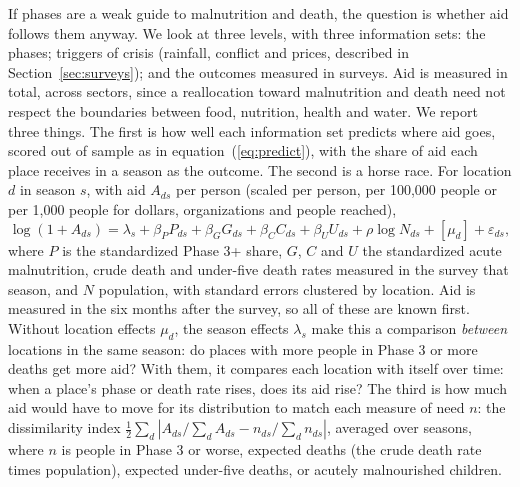 \documentclass[11pt]{article}
\begin{document}
If phases are a weak guide to malnutrition and death, the question is whether aid follows them anyway. We look at three levels, with three information sets: the phases; triggers of crisis (rainfall, conflict and prices, described in Section~\ref{sec:surveys}); and the outcomes measured in surveys. Aid is measured in total, across sectors, since a reallocation toward malnutrition and death need not respect the boundaries between food, nutrition, health and water. We report three things. The first is how well each information set predicts where aid goes, scored out of sample as in equation~(\ref{eq:predict}), with the share of aid each place receives in a season as the outcome. The second is a horse race. For location $d$ in season $s$, with aid $A_{ds}$ per person (scaled per person, per 100,000 people or per 1,000 people for dollars, organizations and people reached),
\begin{equation}\label{eq:aid}
\log(1 + A_{ds}) = \lambda_s + \beta_P P_{ds} + \beta_G G_{ds} + \beta_C C_{ds} + \beta_U U_{ds} + \rho \log N_{ds} + [\mu_d] + \varepsilon_{ds},
\end{equation}
where $P$ is the standardized Phase 3+ share, $G$, $C$ and $U$ the standardized acute malnutrition, crude death and under-five death rates measured in the survey that season, and $N$ population, with standard errors clustered by location. Aid is measured in the six months after the survey, so all of these are known first. Without location effects $\mu_d$, the season effects $\lambda_s$ make this a comparison \emph{between} locations in the same season: do places with more people in Phase 3 or more deaths get more aid? With them, it compares each location with itself over time: when a place's phase or death rate rises, does its aid rise? The third is how much aid would have to move for its distribution to match each measure of need $n$: the dissimilarity index $\tfrac12 \sum_d |A_{ds}/\sum_d A_{ds} - n_{ds}/\sum_d n_{ds}|$, averaged over seasons, where $n$ is people in Phase 3 or worse, expected deaths (the crude death rate times population), expected under-five deaths, or acutely malnourished children.
\end{document}
